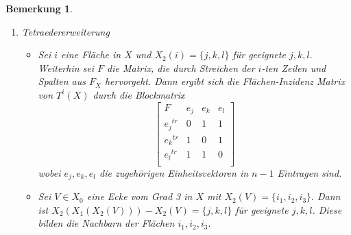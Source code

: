 \documentclass[12pt,titlepage,twoside,cleardoublepage]{article}
\theoremstyle{nummermitklammern}
\newtheorem{bemerkung}[temp]{Bemerkung}
\newtheorem{bemerkung}[zahl]{Bemerkung}
\numberwithin{equation}{section}
\begin{document}
\begin{bemerkung}
\begin{enumerate}
\begin{itemize}
\item Sei $e \in X_1$ eine drehbare Kante und $X_2(e)=\{i_1,i_2\}.$ Dann existieren geeignete Flächen $j_1,j_2,j_3,j_4,$ die 

\begin{align*}
&X_2(X_1(i_1))-\{i_1,i_2\}=\{j_1,j_2\},\\
&X_0(e)\cap X_0(j_1) \cap X_0(j_2)\neq \emptyset
\end{align*}
und 
\begin{align*}
&X_2(X_1(i_2))-\{i_1,i_2\}=\{j_3,j_4\},\\
 &X_0(e)\cap X_0(j_3) \cap X_0(j_4)\neq \emptyset\\
\end{align*}
erfüllen. Die Flächen-Inzidenz-Matrix $F_{X^e}\in \{0,1\}^{n\times n}$ erhält man durch
\[
{F_{X^e}}_{i,j}=
\Biggl{\{\begin{tabular}[l]{lcr}
1,&\textcolor{black}{$(i,j)\in \{(i_1,j_2),(j_2,i_1)\}$} \\
0,&\textcolor{black}{$(i,j)\in \{(i_1,j_3),(j_3,i_1)\}$} \\
1,&\textcolor{black}{$(i,j)\in \{(i_2,j_3),(j_3,i_2)\}$} \\
0,&\textcolor{black}{$(i,j)\in \{(i_2,j_2),(j_2,i_2)\}$} \\
$(F_{X})_{i,j}$,& sonst\\
\end{tabular}}
\]
\end{itemize}
\item Tetraedererweiterung
\begin{itemize}  
\item Sei $i$ eine Fläche in $X$ und $X_2(i)=\{j,k,l\}$ für geeignete $j,k,l.$ Weiterhin sei $F$ die Matrix, die durch Streichen der $i$-ten Zeilen und Spalten aus $F_X$ hervorgeht. Dann ergibt sich die Flächen-Inzidenz Matrix von $T^i(X)$ durch die Blockmatrix
\[
\left[ 
\begin{array}{c|ccc} 
  F & e_j& e_k &e_l \\ 
  \hline 
  {e_j}^{tr} & 0 & 1 & 1  \\
  {e_k}^{tr} & 1 & 0 & 1 \\
  {e_l}^{tr} & 1 & 1 & 0 \\
\end{array} 
\right]
\]
wobei $e_j,e_k,e_l$ die zugehörigen Einheitsvektoren in $n-1$ Eintragen sind. 
\item Sei $V\in X_0$ eine Ecke vom Grad 3 in $X$ mit $X_2(V)=\{i_1,i_2,i_3\}.$ Dann ist $X_2(X_1(X_2(V)))-X_2(V)=\{j,k,l\}$ für geeignete $j,k,l$. Diese bilden die Nachbarn der Flächen $i_1,i_2,i_3.$

\end{itemize}
\end{enumerate}
\end{bemerkung}
\end{document}
